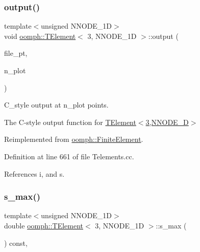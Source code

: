 \subsubsection{\texorpdfstring{output()}{output()}\hspace{0.1cm}{\footnotesize\ttfamily [4/4]}}
{\footnotesize\ttfamily template$<$unsigned N\+N\+O\+D\+E\+\_\+1D$>$ \\
void \hyperlink{classoomph_1_1TElement}{oomph\+::\+T\+Element}$<$ 3, N\+N\+O\+D\+E\+\_\+1D $>$\+::output (\begin{DoxyParamCaption}\item[{F\+I\+LE $\ast$}]{file\+\_\+pt,  }\item[{const unsigned \&}]{n\+\_\+plot }\end{DoxyParamCaption})\hspace{0.3cm}{\ttfamily [virtual]}}



C\+\_\+style output at n\+\_\+plot points. 

The C-\/style output function for \hyperlink{classoomph_1_1TElement_3_013_00_01NNODE__1D_01_4}{T\+Element$<$3,\+N\+N\+O\+D\+E\+\_\+D$>$} 

Reimplemented from \hyperlink{classoomph_1_1FiniteElement_adfaee690bb0608f03320eeb9d110d48c}{oomph\+::\+Finite\+Element}.



Definition at line 661 of file Telements.\+cc.



References i, and s.

\mbox{\label{classoomph_1_1TElement_3_013_00_01NNODE__1D_01_4_a3891a3ac98c4da29b5efd1894b5d4dba}} 
\subsubsection{\texorpdfstring{s\+\_\+max()}{s\_max()}}
{\footnotesize\ttfamily template$<$unsigned N\+N\+O\+D\+E\+\_\+1D$>$ \\
double \hyperlink{classoomph_1_1TElement}{oomph\+::\+T\+Element}$<$ 3, N\+N\+O\+D\+E\+\_\+1D $>$\+::s\+\_\+max (\begin{DoxyParamCaption}{ }\end{DoxyParamCaption}) const\hspace{0.3cm}{\ttfamily [inline]}, {\ttfamily [virtual]}}



